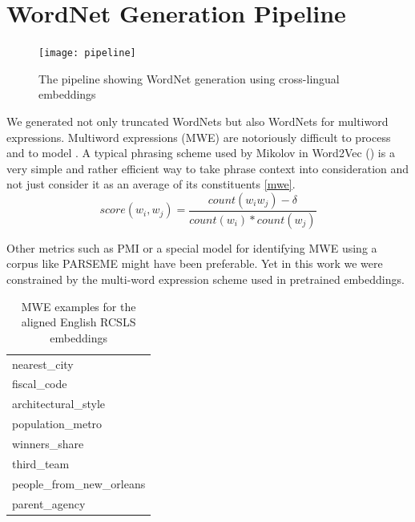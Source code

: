 \documentclass[11pt,a4paper]{article}
\begin{document}
\section{WordNet Generation Pipeline}
\begin{figure}
	
	\centering
	\small
	\texttt{[image: pipeline]}\\
	
	\caption{The pipeline showing WordNet generation using cross-lingual embeddings}
	\label{pipeline}
\end{figure}


We generated not only truncated WordNets but also WordNets for multiword expressions. Multiword expressions (MWE) are notoriously difficult to process and to model \cite{sag2002multiword}. A typical phrasing scheme used by Mikolov in Word2Vec (\citeyear{mikolov-representations-2013}) is a very simple	and rather efficient way to take phrase context into consideration and not just consider it as an average of its constituents \ref{mwe}.
$$score(w_i, w_j) = \frac{count(w_iw_j) - \delta}{count(w_i) * count(w_j)}$$

Other metrics such as PMI \cite{bouma2009normalized} or a special model for identifying MWE using a corpus like PARSEME \cite{savary2018parseme} might have been preferable. Yet in this work we were constrained by the multi-word expression scheme used in pretrained embeddings.
\begin{table}[!htbp]
	\small
	\caption{MWE examples for the aligned English RCSLS embeddings}
	\label{mwe-wiki}		
	\centering
	\begin{tabular}{|l|}
		\hline
		nearest\_city \\
		fiscal\_code \\
		architectural\_style \\
		population\_metro \\
		winners\_share \\
		third\_team \\
		people\_from\_new\_orleans \\
		parent\_agency \\
		\hline
	\end{tabular}
\end{table}
\end{document}
